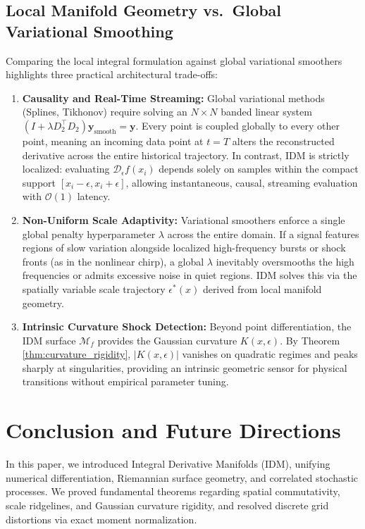 \documentclass[11pt,a4paper]{article}
\theoremstyle{definition}
\begin{document}
\subsection{Local Manifold Geometry vs.\ Global Variational Smoothing}
\label{sec:discussion_tradeoffs}
Comparing the local integral formulation against global variational smoothers highlights three practical architectural trade-offs:
\begin{enumerate}
    \item \textbf{Causality and Real-Time Streaming:} Global variational methods (Splines, Tikhonov) require solving an $N \times N$ banded linear system $(I + \lambda D_2^\top D_2)\mathbf{y}_{\text{smooth}} = \mathbf{y}$. Every point is coupled globally to every other point, meaning an incoming data point at $t = T$ alters the reconstructed derivative across the entire historical trajectory. In contrast, IDM is strictly localized: evaluating $\mathcal{D}_\epsilon f(x_i)$ depends solely on samples within the compact support $[x_i - \epsilon, x_i + \epsilon]$, allowing instantaneous, causal, streaming evaluation with $\mathcal{O}(1)$ latency.
    \item \textbf{Non-Uniform Scale Adaptivity:} Variational smoothers enforce a single global penalty hyperparameter $\lambda$ across the entire domain. If a signal features regions of slow variation alongside localized high-frequency bursts or shock fronts (as in the nonlinear chirp), a global $\lambda$ inevitably oversmooths the high frequencies or admits excessive noise in quiet regions. IDM solves this via the spatially variable scale trajectory $\epsilon^*(x)$ derived from local manifold geometry.
    \item \textbf{Intrinsic Curvature Shock Detection:} Beyond point differentiation, the IDM surface $\mathcal{M}_f$ provides the Gaussian curvature $K(x, \epsilon)$. By Theorem \ref{thm:curvature_rigidity}, $|K(x, \epsilon)|$ vanishes on quadratic regimes and peaks sharply at singularities, providing an intrinsic geometric sensor for physical transitions without empirical parameter tuning.
\end{enumerate}


\section{Conclusion and Future Directions}
\label{sec:conclusion}

In this paper, we introduced Integral Derivative Manifolds (IDM), unifying numerical differentiation, Riemannian surface geometry, and correlated stochastic processes. We proved fundamental theorems regarding spatial commutativity, scale ridgelines, and Gaussian curvature rigidity, and resolved discrete grid distortions via exact moment normalization.
\end{document}
